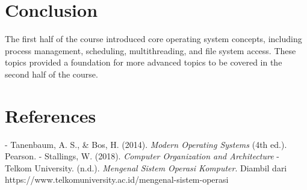 \documentclass[12pt]{article}
\begin{document}
\section{Conclusion}
The first half of the course introduced core operating system concepts, including process management, scheduling, multithreading, and file system access. These topics provided a foundation for more advanced topics to be covered in the second half of the course.

\section{References}
- Tanenbaum, A. S., & Bos, H. (2014). \textit{Modern Operating Systems} (4th ed.). Pearson.
- Stallings, W. (2018). \textit{Computer Organization and Architecture} 
- Telkom University. (n.d.). \textit{Mengenal Sistem Operasi Komputer}. Diambil dari https://www.telkomuniversity.ac.id/mengenal-sistem-operasi
\end{document}
